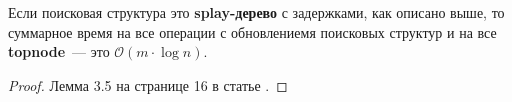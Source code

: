 \begin{lemma}
Если поисковая структура это \textbf{splay-дерево} с задержками, как описано выше, то суммарное время на все операции с обновлениемя поисковых структур и на все \textbf{topnode}~--- это $\mathcal{O}(m\cdot\log{n}).$
\end{lemma}
\begin{proof}
Лемма 3.5 на странице 16 в статье \cite{georgiadis2011data}. 
\end{proof}

